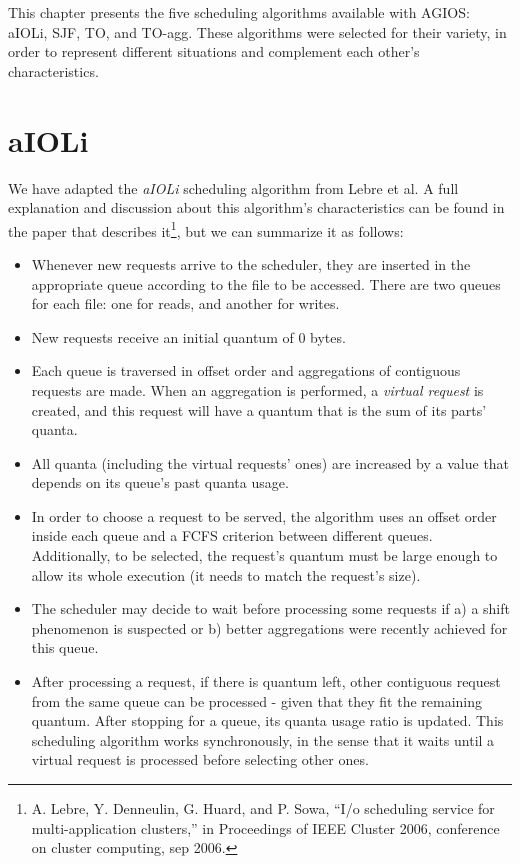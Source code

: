 This chapter presents the five scheduling algorithms available with AGIOS: aIOLi, SJF, TO, and TO-agg. These algorithms were selected for their variety, in order to represent different situations and complement each other's characteristics.

\section{aIOLi} \label{sec:agios_aioli}

We have adapted the \emph{aIOLi} scheduling algorithm from Lebre et al. A full explanation and discussion about this algorithm's characteristics can be found in the paper that describes it\footnote{A. Lebre, Y. Denneulin, G. Huard, and P. Sowa, “I/o scheduling service for multi-application clusters,” in Proceedings of IEEE Cluster 2006, conference on cluster computing, sep 2006.}, but we can summarize it as follows:

\begin{itemize}

  \item Whenever new requests arrive to the scheduler, they are inserted in
    the appropriate queue according to the file to be accessed. There are two
    queues for each file: one for reads, and another for writes.

  \item New requests receive an initial quantum of 0 bytes. 

  \item Each queue is traversed in offset order and aggregations of
    contiguous requests are made. When an aggregation is performed, a
    \emph{virtual request} is created, and this request will have a quantum
    that is the sum of its parts' quanta.

  \item All quanta (including the virtual requests' ones) are increased by a value that depends on its queue's past quanta usage.

  \item In order to choose a request to be served, the algorithm uses an
    offset order inside each queue and a FCFS criterion between
    different queues. Additionally, to be selected, the request's
    quantum must be large enough to allow its whole execution (it needs to match the request's size). 

  \item The scheduler may decide to wait before processing some requests if a) a shift phenomenon is suspected or b) better aggregations were recently achieved for this queue.

  \item After processing a request, if there is quantum left, other contiguous request from the same queue can be processed - given that they fit the remaining quantum. After stopping for a queue, its quanta usage ratio is updated.
This scheduling algorithm works synchronously, in the sense that it waits until a virtual request is processed before selecting other ones.
\end{itemize}

